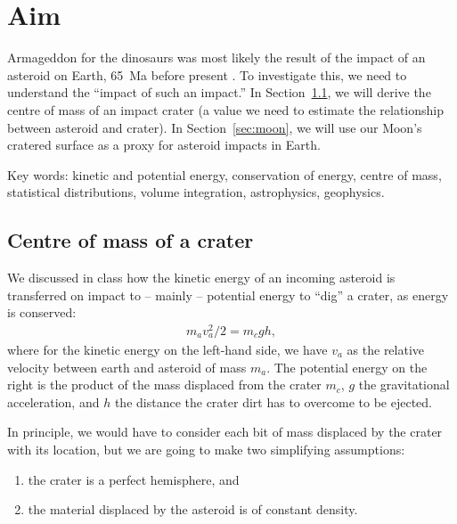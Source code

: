 \documentclass[addpoints]{exam}
\begin{document}
\begin{center}
  \gradetable[h][questions]
\end{center}

\begin{center}
\end{center}
\vspace{0.1in} 

\section{Aim}
Armageddon for the dinosaurs was most likely the result of the impact
of an asteroid on Earth, 65~Ma before present \citep{alvarez2008}. To
investigate this, we need to understand the ``impact of such an
impact.'' In Section~\ref{sec:centreofmass}, we will derive the centre
of mass of an impact crater (a value we need to estimate the
relationship between asteroid and crater). In Section~\ref{sec:moon},
we will use our Moon's cratered surface as a proxy for asteroid
impacts in Earth.

Key words: kinetic and potential energy, conservation of energy,
centre of mass, statistical distributions, volume integration,
astrophysics, geophysics.




\subsection{Centre of mass of a crater}
\label{sec:centreofmass}
We discussed in class how the kinetic energy of an incoming asteroid
is transferred on impact to -- mainly -- potential energy to ``dig'' a
crater, as energy is conserved:
\begin{align}
  m_a v_a^2/2= m_c g h,
  \label{eq:conservenergy}
\end{align} 
where for the kinetic energy on the left-hand side, we have $v_a$ as
the relative velocity between earth and asteroid of mass $m_a$. The
potential energy on the right is the product of the mass displaced
from the crater $m_c$, $g$ the gravitational acceleration, and $h$ the
distance the crater dirt has to overcome to be ejected.

In principle, we would have to consider each bit of mass displaced by
the crater with its location, but we are going to make two
simplifying assumptions:
\begin{enumerate}
\item the crater is a perfect hemisphere, and
\item the material displaced by the asteroid is of constant density.
\end{enumerate}
\end{document}
